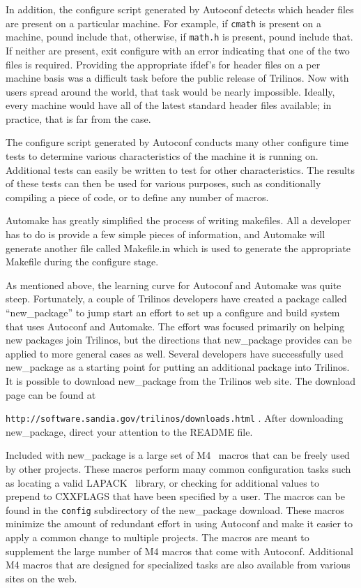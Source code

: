 \documentclass[12pt,relax]{article}
\newcommand{\InlineDirectory}[1]{
  {\hspace{0.01 in}} {\tt #1} {\hspace{0.01 in}}}
\begin{document}
In addition, the configure script generated by Autoconf detects which 
header files are present on a particular 
machine.  For example, if \InlineDirectory{cmath} is present on a machine, 
pound include that, otherwise, if \InlineDirectory{math.h} is present, pound 
include that.  If neither are present, exit configure with an error indicating 
that one of the two files is required.  Providing the appropriate ifdef's 
for header files on a per machine basis was a difficult task before the 
public release of Trilinos.  Now with users spread around the world, that 
task would be nearly impossible.  Ideally, every machine would 
have all of the latest standard header files available; in practice, that 
is far from the case.

The configure script generated by Autoconf conducts many other configure 
time tests to determine various 
characteristics of the machine it is running on.  Additional tests can 
easily be written to test for other characteristics.  The results of these 
tests can then be used for various purposes, such as conditionally compiling 
a piece of code, or to define any number of macros.

Automake has greatly simplified the process of writing makefiles.  All a 
developer has to do is provide a few simple pieces of information, and 
Automake will generate another file called Makefile.in which is used to 
generate the appropriate Makefile during the configure stage.

As mentioned above, the learning curve for Autoconf and Automake was quite 
steep.  Fortunately, a couple of Trilinos developers have created a package 
called ``new\_package'' to jump start an effort to set up a configure and 
build system that uses Autoconf and Automake.  The effort was focused 
primarily on helping new packages join Trilinos, but the directions that 
new\_package provides can be applied to more general cases as well.  Several
developers have successfully used new\_package as a starting point for 
putting an additional
package into Trilinos.  It is possible to download new\_package from the 
Trilinos web site.  The download page can be found at \newline 
\InlineDirectory{http://software.sandia.gov/trilinos/downloads.html}.  After
downloading new\_package, direct your attention to the README file.

Included with new\_package is a large set of M4~\cite{M4} macros that can 
be freely used by other projects.  These macros perform many common 
configuration tasks such as locating a valid LAPACK~\cite{lapack} library, 
or checking for additional values to prepend to CXXFLAGS that have been 
specified by a user.  The macros can be found in the \InlineDirectory{config}
subdirectory of the new\_package download.  These macros minimize the amount of
redundant effort in using Autoconf and make it easier to apply a common change 
to multiple projects.  The macros are meant to supplement the large number of 
M4 macros that come with Autoconf.  Additional M4 macros that are designed for 
specialized tasks are also available from various sites on the web.
\end{document}
